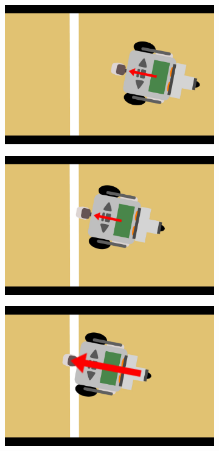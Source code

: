 \documentclass[eind]{penoverslag}
\begin{document}
\begin{figure}
\centering
	\begin{subfigure}[h]{0.24\textwidth}
		\includegraphics[width=\textwidth]{WitteLijn1}
		\caption{ }
		\label{fig:AlgoWit1}
	\end{subfigure}
	\begin{subfigure}[h]{0.24\textwidth}
		\includegraphics[width=\textwidth]{WitteLijn2}
		\caption{ }
		\label{fig:AlgoWit2}
	\end{subfigure}
	\begin{subfigure}[h]{0.24\textwidth}
		\includegraphics[width=\textwidth]{WitteLijn3}

\end{subfigure}
\end{figure}
\end{document}
